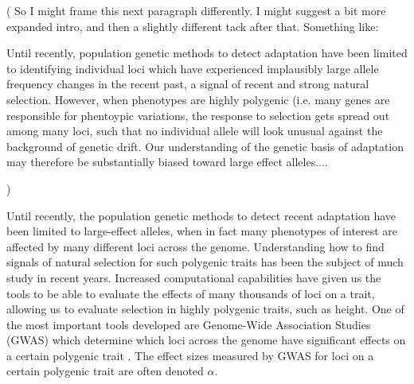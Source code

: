 \documentclass[a4paper,12pt]{article}
\newcommand{\jb}[1]{{\color{blue} (#1)} }
\begin{document}
\jb{
  So I might frame this next paragraph differently. I might suggest a bit more expanded intro,
  and then a slightly different tack after that. Something like:

  Until recently, population genetic methods to detect adaptation have been limited to
  identifying individual loci which have experienced implausibly large allele frequency changes
  in the recent past, a signal of recent and strong natural selection. However, when phenotypes
  are highly polygenic (i.e. many genes are responsible for phentoypic variations, the response
  to selection gets spread out among many loci, such that no individual allele will look unusual
  against the background of genetic drift. Our understanding of the genetic basis of adaptation
  may therefore be substantially biased toward large effect alleles....
  
  
}

Until recently, the population genetic methods to detect recent adaptation have been limited to
large-effect alleles, when in fact many phenotypes of interest
are affected by many different loci across the genome. Understanding
how to find signals of natural selection for such polygenic traits has been
the subject of much study in recent years. Increased computational
capabilities have given us the tools to be able to evaluate the effects
of many thousands of loci on a trait, allowing us to evaluate
selection in highly polygenic traits, such as height. One of the most
important tools developed are Genome-Wide Association Studies (GWAS)
which determine which loci across the genome have significant effects
on a certain polygenic trait \cite{gwasoverview}. The effect sizes
measured by GWAS for loci on a certain polygenic trait are often
denoted $\alpha$.
\end{document}
